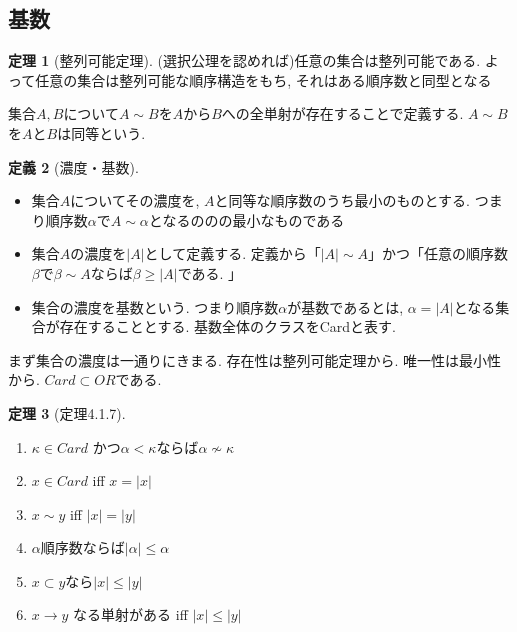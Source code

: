 \documentclass[dvipdfmx,a4paper,11pt]{report}
\theoremstyle{definition}
\newtheorem{thm}{定理}
\newtheorem{dfn}[thm]{定義}
\begin{document}
\subsection{基数}

 \begin{tcolorbox}
 [colback = white, colframe = green!35!black, fonttitle = \bfseries,breakable = true]
\begin{thm}[整列可能定理]
(選択公理を認めれば)任意の集合は整列可能である. 
よって任意の集合は整列可能な順序構造をもち, それはある順序数と同型となる
\end{thm}
\end{tcolorbox}

集合$A,B$について$A\sim B$を$A$から$B$への全単射が存在することで定義する. 
$A\sim B$を$A$と$B$は同等という.

 \begin{tcolorbox}
 [colback = white, colframe = green!35!black, fonttitle = \bfseries,breakable = true]
\begin{dfn}[濃度・基数]
\begin{itemize}
\item 集合$A$についてその濃度を, $A$と同等な順序数のうち最小のものとする. つまり順序数$\alpha$で$A \sim \alpha$となるののの最小なものである
\item 集合$A$の濃度を$|A|$として定義する. 定義から「$|A| \sim A$」かつ「任意の順序数$\beta$で$\beta \sim A$ならば$\beta \ge |A|$である. 」
\item 集合の濃度を基数という. つまり順序数$\alpha$が基数であるとは, $\alpha = |A|$となる集合が存在することとする. 基数全体のクラスをCardと表す.
\end{itemize}
\end{dfn}
\end{tcolorbox}

まず集合の濃度は一通りにきまる. 存在性は整列可能定理から. 唯一性は最小性から. $Card \subset OR$である. 

 \begin{tcolorbox}
 [colback = white, colframe = green!35!black, fonttitle = \bfseries,breakable = true]
\begin{thm}[定理4.1.7]
\begin{enumerate}
\item $\kappa \in Card$ かつ$\alpha < \kappa$ならば$\alpha \not \sim \kappa$
\item $x \in Card$ iff $x = |x|$
\item $x \sim y$ iff $|x| = |y|$
\item $\alpha$順序数ならば$|\alpha| \le \alpha$
\item $x \subset y$なら$|x| \le |y|$
\item $x \to y$ なる単射がある iff $|x| \le |y|$
\end{enumerate}
\end{thm}
\end{tcolorbox}
\end{document}
